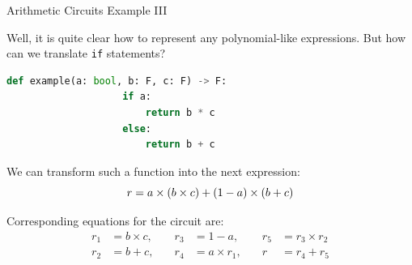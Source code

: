 \documentclass{zkdl-presentation-template}
\begin{document}
    \begin{frame}[fragile]{Arithmetic Circuits Example III}
        \begin{example}
            Well, it is quite clear how to represent any polynomial-like expressions. But how can we
            translate \texttt{if} statements?
            \begin{lstlisting}[language=Python, numbers=none, autogobble=true, xleftmargin=8pt]
                def example(a: bool, b: F, c: F) -> F:
                    if a:
                        return b * c 
                    else:
                        return b + c
            \end{lstlisting}
            
            We can transform such a function into the next expression:
            \vspace{-8pt}
            \begin{equation*}
                r = a \times (b \times c) + (1 - a) \times (b + c)    
                \vspace{-8pt}
            \end{equation*}
            
            Corresponding equations for the circuit are:
            \vspace{-8pt}
            \begin{equation*}
                \begin{aligned}
                    r_1 &= b \times c, \quad &r_3 &= 1 - a, \quad &r_5 &= r_3 \times r_2 \\
                    r_2 &= b + c, \quad &r_4 &= a \times r_1, \quad &r &= r_4 + r_5
                \end{aligned}
            \end{equation*}
        \end{example}
    \end{frame}
\end{document}
